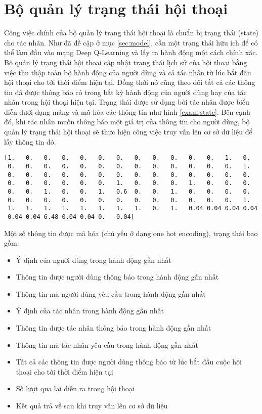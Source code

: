 \section{Bộ quản lý trạng thái hội thoại}
\label{sec:statetracker}
Công việc chính của bộ quản lý trạng thái hội thoại là chuẩn bị trạng thái (state) cho tác nhân. Như đã đề cập ở mục \ref{sec:model}, cần một trạng thái hữu ích để có thể làm đầu vào mạng Deep Q-Learning và lấy ra hành động một cách chính xác. Bộ quản lý trạng thái hội thoại cập nhật trạng thái lịch sử của hội thoại bằng việc thu thập toàn bộ hành động của người dùng và cả tác nhân từ lúc bắt đầu hội thoại cho tới thời điểm hiện tại. Đồng thời nó cũng theo dõi tất cả các thông tin đã được thông báo có trong bất kỳ hành động của người dùng hay của tác nhân trong hội thoại hiện tại. Trạng thái được sử dụng bởi tác nhân được biểu diễn dưới dạng mảng và mã hóa các thông tin như hình \ref{exam:state}. Bên cạnh đó, khi tác nhân muốn thông báo một giá trị của thông tin cho người dùng, bộ quản lý trạng thái hội thoại sẽ thực hiện công việc truy vấn lên cơ sở dữ liệu để lấy thông tin đó.

\renewcommand{\lstlistingname}{Ví dụ}
\begin{lstlisting}[caption={Ví dụ một trạng thái hội thoại},label={exam:state},language=exam_en,firstnumber=1]
[1.   0.   0.   0.   0.   0.   0.   0.   0.   0.   0.   0.   1.   0.
 0.   0.   0.   0.   0.   0.   0.   0.   0.   0.   0.   0.   0.   1.
 0.   0.   0.   0.   0.   0.   0.   0.   0.   0.   0.   0.   0.   0.
 0.   0.   0.   0.   0.   0.   1.   0.   0.   0.   1.   0.   0.   0.
 0.   0.   1.   0.   0.   1.   0.6  0.   0.   1.   0.   0.   0.   0.
 0.   0.   0.   0.   0.   0.   0.   0.   0.   0.   0.   0.   0.   1.
 1.   1.   1.   1.   1.   1.   1.   1.   0.   1.   0.04 0.04 0.04 0.04
 0.04 0.04 6.48 0.04 0.04 0.   0.04]
\end{lstlisting}

Một số thông tin được mã hóa (chủ yếu ở dạng one hot encoding), trạng thái bao gồm:

\begin{itemize}
    \item Ý định của người dùng trong hành động gần nhất
    \item Thông tin được người dùng thông báo trong hành động gần nhất
    \item Thông tin mà người dùng yêu cầu trong hành động gần nhất
    \item Ý định của tác nhân trong hành động gần nhất
    \item Thông tin được tác nhân thông báo trong hành động gần nhất
    \item Thông tin mà tác nhân yêu cầu trong hành động gần nhất
    \item Tất cả các thông tin được người dùng thông báo từ lúc bắt đầu cuộc hội thoại cho tới thời điểm hiện tại
    \item Số lượt qua lại diễn ra trong hội thoại
    \item Kết quả trả về sau khi truy vấn lên cơ sở dữ liệu
\end{itemize}

